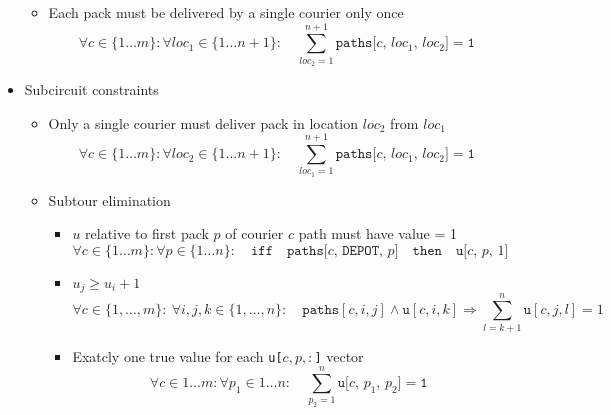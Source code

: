 \begin{itemize}
\begin{itemize}
        \item Each pack must be delivered by a single courier only once
        \begin{equation}
            \label{eq:gen_path_constr3}
            \forall c \in \{1 \ldots m\}:
            \forall loc_1 \in \{1 \ldots n+1\}:
            \quad
            \sum_{loc_2=1}^{n+1} \texttt{paths[$c$, $loc_1$, $loc_2$]} = \texttt{1}
        \end{equation}
    \end{itemize}
    \item Subcircuit constraints
    \begin{itemize}
        \item Only a single courier must deliver pack in location $loc_2$ from $loc_1$
        \begin{equation}
            \label{eq:subtour_constr1}
            \forall c \in \{1 \ldots m\}:
            \forall loc_2 \in \{1 \ldots n+1\}:
            \quad
            \sum_{loc_1=1}^{n+1} \texttt{paths[$c$, $loc_1$, $loc_2$]} = \texttt{1}
        \end{equation}
        \item Subtour elimination
        \begin{itemize}
            \item $u$ relative to first pack $p$ of courier $c$ path must have value = 1
            \begin{equation}
                \label{eq:subtour_constr2}
                \forall c \in \{1 \ldots m\}:
                \forall p \in \{1 \ldots n\}:
                \quad
                \texttt{iff}
                \quad
                \texttt{paths[$c$, DEPOT, $p$]}
                \quad
                \texttt{then}
                \quad
                \texttt{u[$c$, $p$, $1$]}
            \end{equation}
            \item $u_j \geq u_i + 1$
            \begin{equation}
                \label{eq:subtour_constr3}
                \forall c \in \{1, \dots, m\}: \ \forall i, j, k \in \{1, \dots, n\}: \quad
                \texttt{paths}[c, i, j] \land \texttt{u}[c, i, k] \Longrightarrow
                \sum_{l=k+1}^{n} \texttt{u}[c, j, l] = 1
            \end{equation}
            
            \item Exatcly one true value for each \texttt{u[$c, p, :$]} vector
            \begin{equation}
                \label{eq:subtour_constr4}
                \forall c \in 1 \ldots m:
                \forall p_1 \in 1 \ldots n:
                \quad
                \sum_{p_2=1}^{n} \texttt{u[$c$, $p_1$, $p_2$]} = \texttt{1}
            \end{equation}


\end{itemize}
\end{itemize}
\end{itemize}
